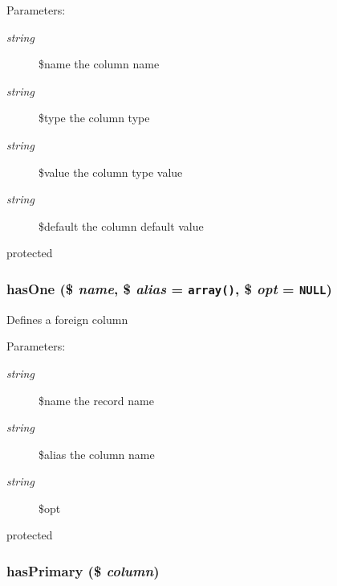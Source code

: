 \begin{Desc}
\item[Parameters:]
\begin{description}
\item[{\em string}]\$name the column name \item[{\em string}]\$type the column type \item[{\em string}]\$value the column type value \item[{\em string}]\$default the column default value\end{description}
\end{Desc}
protected \hypertarget{class_cahnory_d_b___record_4e3bc39c17d522ad92115b6f468e0e0d}{
\subsubsection[{hasOne}]{\setlength{\rightskip}{0pt plus 5cm}hasOne (\$ {\em name}, \/  \$ {\em alias} = {\tt array()}, \/  \$ {\em opt} = {\tt NULL})}}
\label{class_cahnory_d_b___record_4e3bc39c17d522ad92115b6f468e0e0d}


Defines a foreign column

\begin{Desc}
\item[Parameters:]
\begin{description}
\item[{\em string}]\$name the record name \item[{\em string}]\$alias the column name \item[{\em string}]\$opt\end{description}
\end{Desc}
protected \hypertarget{class_cahnory_d_b___record_4361756ffa4efc1520773351e302e00e}{
\subsubsection[{hasPrimary}]{\setlength{\rightskip}{0pt plus 5cm}hasPrimary (\$ {\em column})}}
\label{class_cahnory_d_b___record_4361756ffa4efc1520773351e302e00e}


